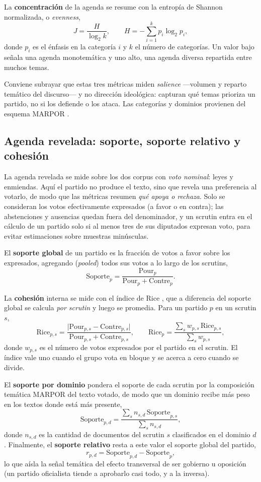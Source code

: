 La \textbf{concentración} de la agenda se resume con la entropía de Shannon
\cite{shannon1948mathematical} normalizada, o \emph{evenness},
\[
J = \frac{H}{\log_2 k}, \qquad H = -\sum_{i=1}^{k} p_i \log_2 p_i,
\]
donde $p_i$ es el énfasis en la categoría $i$ y $k$ el número de categorías. Un
valor bajo señala una agenda monotemática y uno alto, una agenda diversa
repartida entre muchos temas.

Conviene subrayar que estas tres métricas miden \emph{salience} ---volumen y
reparto temático del discurso--- y no dirección ideológica: capturan qué temas
prioriza un partido, no si los defiende o los ataca. Las categorías y dominios
provienen del esquema MARPOR \cite{marpor_mp_v5}.

\subsection{Agenda revelada: soporte, soporte relativo y cohesión}
\label{sec:metricas-revelada}

La agenda revelada se mide sobre los dos corpus con \emph{voto nominal}: leyes y
enmiendas. Aquí el partido no produce el texto, sino que revela una preferencia
al votarlo, de modo que las métricas resumen \emph{qué apoya o rechaza}. Solo se
consideran los votos efectivamente expresados (a favor o en contra); las
abstenciones y ausencias quedan fuera del denominador, y un scrutin entra en el
cálculo de un partido solo si al menos tres de sus diputados expresan voto, para
evitar estimaciones sobre muestras minúsculas.

El \textbf{soporte global} de un partido es la fracción de votos a favor sobre
los expresados, agregando (\emph{pooled}) todos sus votos a lo largo de los
scrutins,
\[
\text{Soporte}_p = \frac{\text{Pour}_p}{\text{Pour}_p + \text{Contre}_p}.
\]

La \textbf{cohesión} interna se mide con el índice de Rice
\cite{rice1928quantitative}, que a diferencia del soporte global se calcula
\emph{por scrutin} y luego se promedia. Para un partido $p$ en un scrutin $s$,
\[
\text{Rice}_{p,s} = \frac{\lvert \text{Pour}_{p,s} - \text{Contre}_{p,s} \rvert}{\text{Pour}_{p,s} + \text{Contre}_{p,s}},
\qquad
\text{Rice}_p = \frac{\sum_{s} w_{p,s}\,\text{Rice}_{p,s}}{\sum_{s} w_{p,s}},
\]
donde $w_{p,s}$ es el número de votos expresados por el partido en el scrutin.
El índice vale uno cuando el grupo vota en bloque y se acerca a cero cuando se
divide.

El \textbf{soporte por dominio} pondera el soporte de cada scrutin por la
composición temática MARPOR del texto votado, de modo que un dominio recibe más
peso en los textos donde está más presente,
\[
\text{Soporte}_{p,d} = \frac{\sum_{s} n_{s,d}\,\text{Soporte}_{p,s}}{\sum_{s} n_{s,d}},
\]
donde $n_{s,d}$ es la cantidad de documentos del scrutin $s$ clasificados en el
dominio $d$. Finalmente, el \textbf{soporte relativo} resta a este valor el
soporte global del partido,
\[
r_{p,d} = \text{Soporte}_{p,d} - \text{Soporte}_p,
\]
lo que aísla la señal temática del efecto transversal de ser gobierno u
oposición (un partido oficialista tiende a aprobarlo casi todo, y a la inversa).

